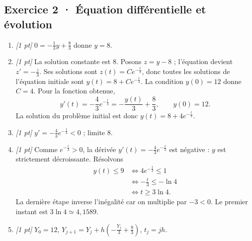 \subsection*{Exercice 2 · Équation différentielle et évolution}\begin{enumerate}

\item \textit{[1 pt]} $0=-\frac{1}{3}y+\frac{8}{3}$ donne $y=8$.

\item \textit{[1 pt]} La solution constante est $8$. Posons $z=y-8$ ; l'équation devient $z'=-\frac{z}{3}$. Ses solutions sont $z(t)=Ce^{-\frac{t}{3}}$, donc toutes les solutions de l'équation initiale sont $y(t)=8+Ce^{-\frac{t}{3}}$.
La condition $y(0)=12$ donne $C=4$. Pour la fonction obtenue,
\[y'(t)=-\frac{4}{3}e^{-\frac{t}{3}}=-\frac{y(t)}{3}+\frac{8}{3},\qquad y(0)=12.\]
La solution du problème initial est donc $y(t)=8+4e^{-\frac{t}{3}}$.

\item \textit{[1 pt]} $y'=-\frac{4}{3}e^{-\frac{t}{3}}<0$ ; limite $8$.

\item \textit{[1 pt]} Comme $e^{-\frac{t}{3}}>0$, la dérivée $y'(t)=-\frac{4}{3}e^{-\frac{t}{3}}$ est négative : $y$ est strictement décroissante. Résolvons
\[\begin{aligned}y(t)\le 9&\Longleftrightarrow 4e^{-\frac{t}{3}}\le1\\&\Longleftrightarrow -\frac{t}{3}\le-\ln 4\\&\Longleftrightarrow t\ge 3\ln 4.\end{aligned}\]
La dernière étape inverse l'inégalité car on multiplie par $-3<0$. Le premier instant est $3\ln 4\simeq4{,}1589$.

\item \textit{[1 pt]} $Y_0=12$, $Y_{j+1}=Y_j+h(-\frac{Y_j}{3}+\frac{8}{3})$, $t_j=jh$.

\end{enumerate}

